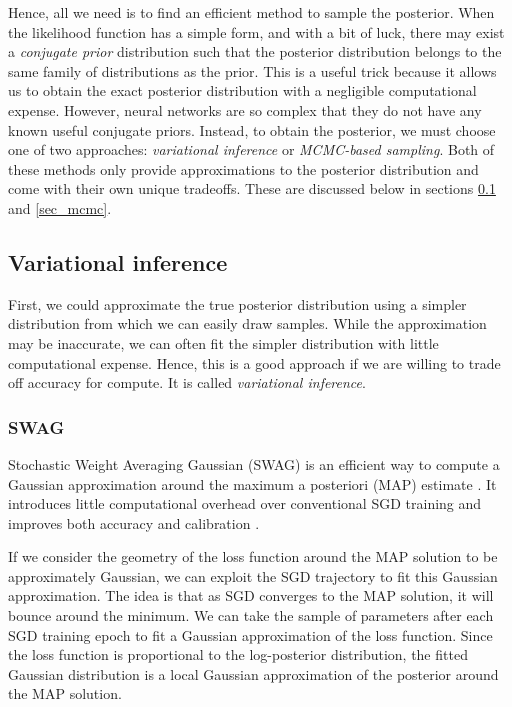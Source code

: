 \documentclass[12pt]{article}
\begin{document}
Hence, all we need is to find an efficient method to sample the posterior. When the likelihood function has a simple form, and with a bit of luck, there may exist a \textit{conjugate prior} distribution such that the posterior distribution belongs to the same family of distributions as the prior. This is a useful trick because it allows us to obtain the exact posterior distribution with a negligible computational expense. However, neural networks are so complex that they do not have any known useful conjugate priors. Instead, to obtain the posterior, we must choose one of two approaches: \textit{variational inference} or \textit{MCMC-based sampling}. Both of these methods only provide approximations to the posterior distribution and come with their own unique tradeoffs. These are discussed below in sections \ref{sec_vi} and \ref{sec_mcmc}.

\subsection{Variational inference}
\label{sec_vi}

First, we could approximate the true posterior distribution using a simpler distribution from which we can easily draw samples. While the approximation may be inaccurate, we can often fit the simpler distribution with little computational expense. Hence, this is a good approach if we are willing to trade off accuracy for compute. It is called \textit{variational inference}.

\subsubsection{SWAG}

Stochastic Weight Averaging Gaussian (SWAG) is an efficient way to compute a Gaussian approximation around the maximum a posteriori (MAP) estimate \cite{swag}. It introduces little computational overhead over conventional SGD training and improves both accuracy and calibration \cite{swag}.

If we consider the geometry of the loss function around the MAP solution to be approximately Gaussian, we can exploit the SGD trajectory to fit this Gaussian approximation. The idea is that as SGD converges to the MAP solution, it will bounce around the minimum. We can take the sample of parameters after each SGD training epoch to fit a Gaussian approximation of the loss function. Since the loss function is proportional to the log-posterior distribution, the fitted Gaussian distribution is a local Gaussian approximation of the posterior around the MAP solution.
\end{document}
